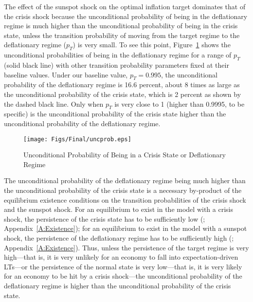 \documentclass[11pt]{article}
\begin{document}
	
    The effect of the sunspot shock on the optimal inflation target dominates that of the crisis shock because the unconditional probability of being in the deflationary regime is much higher than the unconditional probability of being in the crisis state, unless the transition probability of moving from the target regime to the deflationary regime ($p_{T}$) is very small. To see this point, Figure~\ref {fig:UncProb} shows the unconditional probabilities of being in the deflationary regime for a range of $p_{T}$ (solid black line) with other transition probability parameters fixed at their baseline values. Under our baseline value, $p_{T}=0.995$, the unconditional probability of the deflationary regime is 16.6 percent, about 8 times as large as the unconditional probability of the crisis state, which is 2 percent as shown by the dashed black line. Only when $p_{T}$ is very close to 1 (higher than 0.9995, to be specific) is the unconditional probability of the crisis state higher than the unconditional probability of the deflationary regime.

	\begin{figure}[!h]
		\begin{center}
			\caption{Unconditional Probability of Being in a Crisis State or Deflationary Regime\label{fig:UncProb}}
			\texttt{[image: Figs/Final/uncprob.eps]}\\
		\end{center}
	\end{figure}
	
	The unconditional probability of the deflationary regime being much higher than the unconditional probability of the crisis state is a necessary by-product of the equilibrium existence conditions on the transition probabilities of the crisis shock and the sunspot shock. For an equilibrium to exist in the model with a crisis shock, the persistence of the crisis state has to be sufficiently low (\citet{NakataSchmidtForthcomingJME}; Appendix~\ref{A:Existence}); for an equilibrium to exist in the model with a sunspot shock, the persistence of the deflationary regime has to be sufficiently high (\citet{NakataSchmidt2019}; Appendix~\ref{A:Existence}). Thus, unless the persistence of the target regime is very high---that is, it is very unlikely for an economy to fall into expectation-driven LTs---or the persistence of the normal state is very low---that is, it is very likely for an economy to be hit by a crisis shock---the unconditional probability of the deflationary regime is higher than the unconditional probability of the crisis state.
\end{document}
